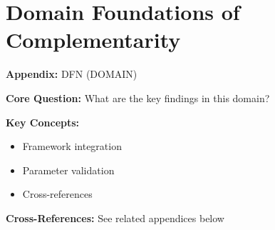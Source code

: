 %
%
%
%

\chapter{Domain Foundations of Complementarity}
\label{app:domain-found}


\begin{tcolorbox}[colback=blue!5!white, colframe=blue!75!black,
    title=Quick Reference: Appendix DFN]

\textbf{Appendix:} DFN (DOMAIN)

\textbf{Core Question:} What are the key findings in this domain?

\textbf{Key Concepts:}
\begin{itemize}[nosep]
\item Framework integration
\item Parameter validation
\item Cross-references
\end{itemize}

\textbf{Cross-References:} See related appendices below
\end{tcolorbox}

\begin{abstract}
This appendix bridges the gap between pure mathematical complementarity theory
(Appendix FND) and domain-specific applications. We establish how the abstract
mathematical structures—lattices, supermodularity, and interaction tensors—manifest
in three primary domains: \textbf{Economics} (utility theory, production, games),
\textbf{Psychology} (behavioral interactions, cognitive complementarities), and
\textbf{Management} (organizational design, strategic fit). For each domain, we
provide: (1) the interpretation of $\gamma$, (2) domain-specific axioms,
(3) measurement approaches, and (4) typical parameter ranges from empirical literature.
This creates the foundation for Layer 4: EBF-specific application.
\end{abstract}


